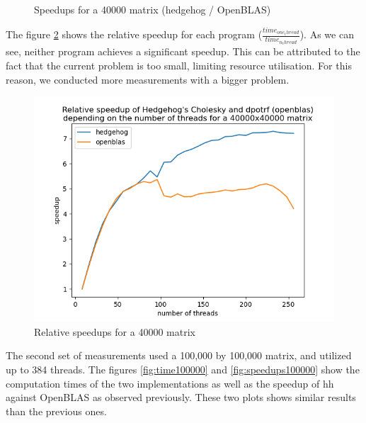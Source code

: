 \begin{figure}[!htb]
\begin{minipage}{0.48\linewidth}
    \caption{Speedups for a 40000 matrix (hedgehog / OpenBLAS)}
    \label{fig:speedups40000}
  \end{minipage}
\end{figure}

The figure \ref{fig:relativespeedup40000} shows the relative speedup for each
program ($\frac{time_{one_thread}}{time_{n_thread}}$). As we can see, neither
program achieves a significant speedup. This can be attributed to the fact that
the current problem is too small, limiting resource utilisation. For this
reason, we conducted more measurements with a bigger problem.

\begin{figure}[!ht]
  \begin{center}
    \includegraphics[scale=0.8]{img/cho-img/relative-speedup-40000.png}
    \caption{Relative speedups for a 40000 matrix}
    \label{fig:relativespeedup40000}
  \end{center}
\end{figure}

The second set of measurements used a 100,000 by 100,000 matrix, and utilized up
to 384 threads. The figures \ref{fig:time100000} and \ref{fig:speedups100000}
show the computation times of the two implementations as well as the speedup
of \gls{hh} against OpenBLAS as observed previously. These two plots shows
similar results than the previous ones.

